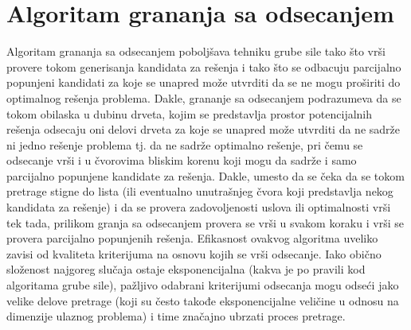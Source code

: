 \documentclass[12pt,oneside]{memoir}
\begin{document}
\section{Algoritam grananja sa odsecanjem}
\label{sec:algGrananjaSaOdsecanjem}
Algoritam grananja sa odsecanjem poboljšava tehniku grube sile tako što vrši provere tokom generisanja
kandidata za rešenja i tako što se odbacuju parcijalno popunjeni kandidati za koje se unapred može utvrditi
da se ne mogu proširiti do optimalnog rešenja problema. Dakle, grananje sa odsecanjem podrazumeva da se tokom
obilaska u dubinu drveta, kojim se predstavlja prostor potencijalnih rešenja odsecaju oni delovi drveta za koje se unapred
može utvrditi da ne sadrže ni jedno rešenje problema tj. da ne sadrže optimalno rešenje, pri čemu se odsecanje vrši
i u čvorovima bliskim korenu koji mogu da sadrže i samo parcijalno popunjene kandidate za rešenja.
Dakle, umesto da se čeka da se tokom pretrage stigne do lista (ili eventualno unutrašnjeg čvora koji predstavlja
nekog kandidata za rešenje) i da se provera zadovoljenosti uslova ili optimalnosti vrši tek tada, prilikom granja sa
odsecanjem provera se vrši u svakom koraku i vrši se provera parcijalno popunjenih rešenja.
Efikasnost ovakvog algoritma uveliko zavisi od kvaliteta kriterijuma na osnovu kojih se vrši odsecanje. Iako obično
složenost najgoreg slučaja ostaje eksponencijalna (kakva je po pravili kod algoritama grube sile), pažljivo odabrani
kriterijumi odsecanja mogu odseći jako velike delove pretrage (koji su često takođe eksponencijalne veličine u odnosu
na dimenzije ulaznog problema) i time značajno ubrzati proces pretrage.
\end{document}
